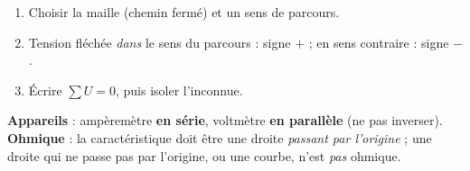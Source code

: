 \documentclass[11pt,a4paper]{article}
\begin{document}
\begin{methode}
\begin{enumerate}[leftmargin=1.7em,topsep=1pt,itemsep=1pt]
  \item Choisir la maille (chemin fermé) et un sens de parcours.
  \item Tension fléchée \emph{dans} le sens du parcours : signe $+$ ; en sens contraire : signe $-$.
  \item Écrire $\sum U=0$, puis isoler l'inconnue.
\end{enumerate}
\end{methode}

\begin{piege}
\textbf{Appareils} : ampèremètre \textbf{en série}, voltmètre \textbf{en parallèle} (ne pas
inverser). \textbf{Ohmique} : la caractéristique doit être une droite \emph{passant par l'origine} ;
une droite qui ne passe pas par l'origine, ou une courbe, n'est \emph{pas} ohmique.
\end{piege}
\end{document}
